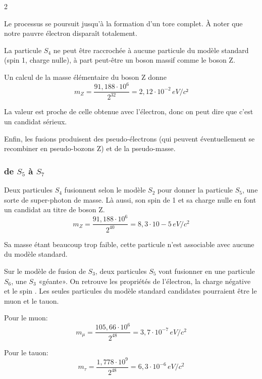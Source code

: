 \begin{multicols}{2}

Le processus se poursuit jusqu'à la formation d'un tore complet.
À noter que notre pauvre électron disparaît totalement.

La particule $S_4$ ne peut être raccrochée à aucune particule du modèle
standard (spin 1, charge nulle), à part peut-être un boson massif
comme le boson Z.

Un calcul de la masse élémentaire du boson Z donne
\begin{equation*}
m_{Z} = \frac{91,188 \cdot 10^6}{2^{32}} = 2,12 \cdot 10^{-2}\,eV/c²
\end{equation*}

La valeur est proche de celle obtenue avec l'électron, donc on peut
dire que c'est un candidat sérieux.

Enfin, les fusions produisent des pseudo-électrons (qui peuvent éventuellement se recombiner en pseudo-bozons Z) et de la pseudo-masse.

\subsubsection{de $S_5$ à $S_7$}

Deux particules $S_4$ fusionnent selon le modèle $S_2$ pour donner la
particule $S_5$, une sorte de super-photon de masse. Là aussi, son spin
de 1 et sa charge nulle en font un candidat au titre de boson Z.
\begin{equation*}
m_{Z} = \frac{91,188 \cdot 10^6}{2^{40}} = 8,3 \cdot 10-5\,eV/c^2
\end{equation*}

Sa masse étant beaucoup trop faible, cette particule n'est
associable avec aucune du modèle standard.

Sur le modèle de fusion de $S_3$, deux particules $S_5$ vont fusionner en
une particule $S_6$, une $S_3$ «géante». On retrouve les propriétés de
l'électron, la charge négative et le spin . Les seules particules
du modèle standard candidates pourraient être le muon et le tauon.

Pour le muon:
\begin{equation*}
m_{\mu} = \frac{105,66 \cdot 10^6} {2^{48}} = 3,7 \cdot 10^{-7}\,eV/c^2
\end{equation*}

Pour le tauon:
\begin{equation*}
m_{\tau} = \frac{1,778 \cdot 10^9}{ 2^{48}} = 6,3 \cdot 10^{-6}\,eV/c^2
\end{equation*}


\end{multicols}

